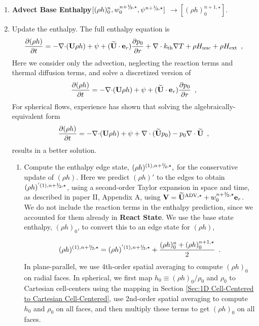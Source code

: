 \begin{description}
\begin{enumerate}
\item {\bf Advect Base Enthalpy}$[(\rho h)_0^{n}, w_0^{\nph,\star}, \psi^{\nph,\star}]$ 
$\rightarrow [(\rho h)_0^{n+1,\star}]$.

\item Update the enthalpy.  The full enthalpy equation is 
  \begin{equation}
  \frac{\partial (\rho h)}{\partial t}  = - \mathbf{\nabla} \mathbf{\cdot} ({\bf U} \rho h)
+ \psi + (\widetilde{{\bf U}} \cdot \mathbf{e}_r) \frac{\partial p_0}{\partial r} + \nabla\cdot k_{\rm th}\nabla T + \rho {H_{\rm nuc}} + \rho {H_{\rm ext}} 
\enskip , \label{eq:rhohupd} 
  \end{equation}
Here we consider only the advection, neglecting the reaction terms and thermal diffusion terms,
and solve a discretized version of
  \begin{equation}
  \frac{\partial (\rho h)}{\partial t}  = - \mathbf{\nabla} \mathbf{\cdot} ({\bf U} \rho h)
+ \psi + (\widetilde{{\bf U}} \cdot \mathbf{e}_r) \frac{\partial p_0}{\partial r} 
\enskip , \label{eq:rhohupdadv} 
  \end{equation}
For spherical flows, experience has shown that solving the algebraically-equivalent form
\begin{equation}
  \frac{\partial (\rho h)}{\partial t}  = - \mathbf{\nabla} \mathbf{\cdot} ({\bf U} \rho h)
+ \psi + \nabla \cdot (\widetilde{{\bf U}} p_0) - p_0 \nabla \cdot \widetilde{{\bf U}}  
\enskip , \label{eq:rhohupdadv2} 
\end{equation}
results in a better solution.


  \begin{enumerate}
  \renewcommand{\labelenumii}{{\bf \roman{enumii}}.}

  \item Compute the enthalpy edge state, $(\rho h)^{(1),\nph,\star},$
    for the conservative update of $(\rho h).$  Here we predict $(\rho
    h)'$ to the edges to obtain $(\rho h)^{'(1),\nph,\star}$, 
    using a second-order Taylor expansion in space
    and time, as described in paper II, Appendix A, using $\Vb =
    \uadvone+w_0^{\nph,\star} \er$.  We do not include the reaction
    terms in the enthalpy prediction, since we accounted for them
    already in {\bf React State}.  We use the base state enthalpy,
    $(\rho h)_0$, to convert this to an edge state for $(\rho h)$,

    
\begin{equation}
(\rho h)^{(1),\nph,\star} = 
(\rho h)^{'(1),\nph,\star} + \frac{(\rho h)_0^n + (\rho h)_0^{n+1,\star}}{2}
\enskip .
\end{equation}
  In plane-parallel, we use 4th-order spatial averaging to compute $(\rho h)_0$
  on radial faces.  In spherical, we first map $h_0 \equiv (\rho h)_0/\rho_0$ 
  and $\rho_0$ to Cartesian cell-centers using the mapping in Section 
  \ref{Sec:1D Cell-Centered to Cartesian Cell-Centered}, use 2nd-order spatial 
  averaging to compute $h_0$ and $\rho_0$ on all faces, and then multiply these 
  terms to get $(\rho h)_0$ on all faces.


\end{enumerate}
\end{enumerate}
\end{description}

